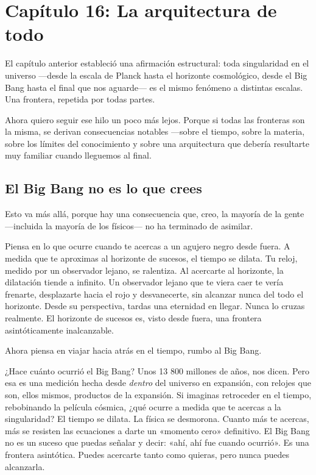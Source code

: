 \documentclass[11pt, twoside, openright]{book}
\begin{document}
\chapter*{Capítulo 16: La arquitectura de todo}

El capítulo anterior estableció una afirmación estructural: toda singularidad en el universo ---desde la escala de Planck hasta el horizonte cosmológico, desde el Big Bang hasta el final que nos aguarde--- es el mismo fenómeno a distintas escalas. Una frontera, repetida por todas partes.

Ahora quiero seguir ese hilo un poco más lejos. Porque si todas las fronteras son la misma, se derivan consecuencias notables ---sobre el tiempo, sobre la materia, sobre los límites del conocimiento y sobre una arquitectura que debería resultarte muy familiar cuando lleguemos al final.


\section*{El Big Bang no es lo que crees}

Esto va más allá, porque hay una consecuencia que, creo, la mayoría de la gente ---incluida la mayoría de los físicos--- no ha terminado de asimilar.

Piensa en lo que ocurre cuando te acercas a un agujero negro desde fuera. A medida que te aproximas al horizonte de sucesos, el tiempo se dilata. Tu reloj, medido por un observador lejano, se ralentiza. Al acercarte al horizonte, la dilatación tiende a infinito. Un observador lejano que te viera caer te vería frenarte, desplazarte hacia el rojo y desvanecerte, sin alcanzar nunca del todo el horizonte. Desde su perspectiva, tardas una eternidad en llegar. Nunca lo cruzas realmente. El horizonte de sucesos es, visto desde fuera, una frontera asintóticamente inalcanzable.

Ahora piensa en viajar hacia atrás en el tiempo, rumbo al Big Bang.

¿Hace cuánto ocurrió el Big Bang? Unos 13 800 millones de años, nos dicen. Pero esa es una medición hecha desde \textit{dentro} del universo en expansión, con relojes que son, ellos mismos, productos de la expansión. Si imaginas retroceder en el tiempo, rebobinando la película cósmica, ¿qué ocurre a medida que te acercas a la singularidad? El tiempo se dilata. La física se desmorona. Cuanto más te acercas, más se resisten las ecuaciones a darte un «momento cero» definitivo. El Big Bang no es un suceso que puedas señalar y decir: «ahí, ahí fue cuando ocurrió». Es una frontera asintótica. Puedes acercarte tanto como quieras, pero nunca puedes alcanzarla.
\end{document}
